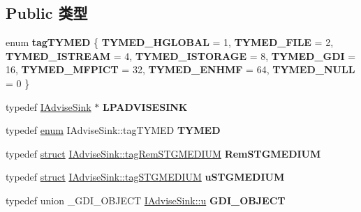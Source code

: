 \subsection*{Public 类型}
\begin{DoxyCompactItemize}
\item 
\mbox{\label{interface_i_advise_sink_ac622c09f53e54516b2a012ec6528204b}} 
enum {\bfseries tag\+T\+Y\+M\+ED} \{ \newline
{\bfseries T\+Y\+M\+E\+D\+\_\+\+H\+G\+L\+O\+B\+AL} = 1, 
{\bfseries T\+Y\+M\+E\+D\+\_\+\+F\+I\+LE} = 2, 
{\bfseries T\+Y\+M\+E\+D\+\_\+\+I\+S\+T\+R\+E\+AM} = 4, 
{\bfseries T\+Y\+M\+E\+D\+\_\+\+I\+S\+T\+O\+R\+A\+GE} = 8, 
\newline
{\bfseries T\+Y\+M\+E\+D\+\_\+\+G\+DI} = 16, 
{\bfseries T\+Y\+M\+E\+D\+\_\+\+M\+F\+P\+I\+CT} = 32, 
{\bfseries T\+Y\+M\+E\+D\+\_\+\+E\+N\+H\+MF} = 64, 
{\bfseries T\+Y\+M\+E\+D\+\_\+\+N\+U\+LL} = 0
 \}
\item 
\mbox{\label{interface_i_advise_sink_ad7affb29bd4c172c5a8cdd3e71806d2c}} 
typedef \hyperlink{interface_i_advise_sink}{I\+Advise\+Sink} $\ast$ {\bfseries L\+P\+A\+D\+V\+I\+S\+E\+S\+I\+NK}
\item 
\mbox{\label{interface_i_advise_sink_a9380ac5012490031498b57688a050228}} 
typedef \hyperlink{interfaceenum}{enum} I\+Advise\+Sink\+::tag\+T\+Y\+M\+ED {\bfseries T\+Y\+M\+ED}
\item 
\mbox{\label{interface_i_advise_sink_aaa6f2f47836ad1e4608dc83557b39260}} 
typedef \hyperlink{interfacestruct}{struct} \hyperlink{struct_i_advise_sink_1_1tag_rem_s_t_g_m_e_d_i_u_m}{I\+Advise\+Sink\+::tag\+Rem\+S\+T\+G\+M\+E\+D\+I\+UM} {\bfseries Rem\+S\+T\+G\+M\+E\+D\+I\+UM}
\item 
\mbox{\label{interface_i_advise_sink_a692e66a2fb6d73c22425107712d91b2a}} 
typedef \hyperlink{interfacestruct}{struct} \hyperlink{struct_i_advise_sink_1_1tag_s_t_g_m_e_d_i_u_m}{I\+Advise\+Sink\+::tag\+S\+T\+G\+M\+E\+D\+I\+UM} {\bfseries u\+S\+T\+G\+M\+E\+D\+I\+UM}
\item 
\mbox{\label{interface_i_advise_sink_a886a94db1fbf305d1655df005c6d7120}} 
typedef union \+\_\+\+G\+D\+I\+\_\+\+O\+B\+J\+E\+CT \hyperlink{union_i_advise_sink_1_1u}{I\+Advise\+Sink\+::u} {\bfseries G\+D\+I\+\_\+\+O\+B\+J\+E\+CT}

\end{DoxyCompactItemize}
